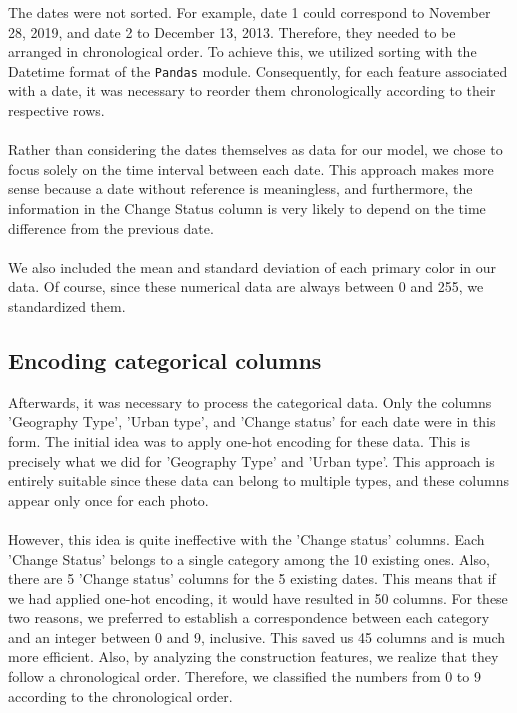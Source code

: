 The dates were not sorted. For example, date 1 could correspond to November 28, 2019, and date 2 to December 13, 2013. Therefore, they needed to be arranged in chronological order. To achieve this, we utilized sorting with the Datetime format of the \texttt{Pandas} module. Consequently, for each feature associated with a date, it was necessary to reorder them chronologically according to their respective rows.\\ \\
Rather than considering the dates themselves as data for our model, we chose to focus solely on the time interval between each date. This approach makes more sense because a date without reference is meaningless, and furthermore, the information in the Change Status column is very likely to depend on the time difference from the previous date.\\ \\
We also included the mean and standard deviation of each primary color in our data. Of course, since these numerical data are always between 0 and 255, we standardized them.

\subsection{Encoding categorical columns}

Afterwards, it was necessary to process the categorical data. Only the columns 'Geography Type', 'Urban type', and 'Change status' for each date were in this form. The initial idea was to apply one-hot encoding for these data. This is precisely what we did for 'Geography Type' and 'Urban type'. This approach is entirely suitable since these data can belong to multiple types, and these columns appear only once for each photo. \\ \\
However, this idea is quite ineffective with the 'Change status' columns. Each 'Change Status' belongs to a single category among the 10 existing ones. Also, there are 5 'Change status' columns for the 5 existing dates. This means that if we had applied one-hot encoding, it would have resulted in 50 columns. For these two reasons, we preferred to establish a correspondence between each category and an integer between 0 and 9, inclusive. This saved us 45 columns and is much more efficient. Also, by analyzing the construction features, we realize that they follow a chronological order. Therefore, we classified the numbers from 0 to 9 according to the chronological order.

